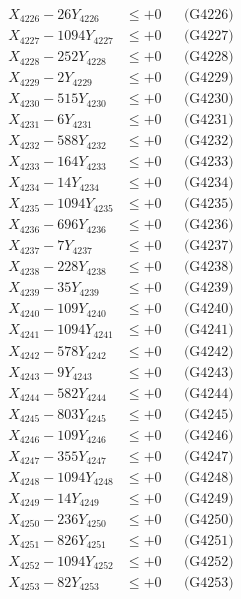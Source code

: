 \documentclass[a4paper,10pt]{article}
\begin{document}
{\begin{align}
X_{4226} - 26Y_{4226} &\leq +0 && \text{(G4226)} \\
X_{4227} - 1094Y_{4227} &\leq +0 && \text{(G4227)} \\
X_{4228} - 252Y_{4228} &\leq +0 && \text{(G4228)} \\
X_{4229} - 2Y_{4229} &\leq +0 && \text{(G4229)} \\
X_{4230} - 515Y_{4230} &\leq +0 && \text{(G4230)} \\
\allowbreak
X_{4231} - 6Y_{4231} &\leq +0 && \text{(G4231)} \\
X_{4232} - 588Y_{4232} &\leq +0 && \text{(G4232)} \\
X_{4233} - 164Y_{4233} &\leq +0 && \text{(G4233)} \\
X_{4234} - 14Y_{4234} &\leq +0 && \text{(G4234)} \\
X_{4235} - 1094Y_{4235} &\leq +0 && \text{(G4235)} \\
X_{4236} - 696Y_{4236} &\leq +0 && \text{(G4236)} \\
X_{4237} - 7Y_{4237} &\leq +0 && \text{(G4237)} \\
X_{4238} - 228Y_{4238} &\leq +0 && \text{(G4238)} \\
X_{4239} - 35Y_{4239} &\leq +0 && \text{(G4239)} \\
X_{4240} - 109Y_{4240} &\leq +0 && \text{(G4240)} \\
\allowbreak
X_{4241} - 1094Y_{4241} &\leq +0 && \text{(G4241)} \\
X_{4242} - 578Y_{4242} &\leq +0 && \text{(G4242)} \\
X_{4243} - 9Y_{4243} &\leq +0 && \text{(G4243)} \\
X_{4244} - 582Y_{4244} &\leq +0 && \text{(G4244)} \\
X_{4245} - 803Y_{4245} &\leq +0 && \text{(G4245)} \\
X_{4246} - 109Y_{4246} &\leq +0 && \text{(G4246)} \\
X_{4247} - 355Y_{4247} &\leq +0 && \text{(G4247)} \\
X_{4248} - 1094Y_{4248} &\leq +0 && \text{(G4248)} \\
X_{4249} - 14Y_{4249} &\leq +0 && \text{(G4249)} \\
X_{4250} - 236Y_{4250} &\leq +0 && \text{(G4250)} \\
\allowbreak
X_{4251} - 826Y_{4251} &\leq +0 && \text{(G4251)} \\
X_{4252} - 1094Y_{4252} &\leq +0 && \text{(G4252)} \\
X_{4253} - 82Y_{4253} &\leq +0 && \text{(G4253)} \\

\end{align}}
\end{document}
